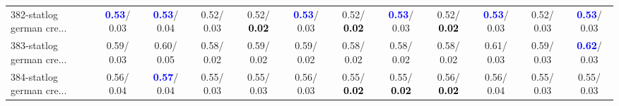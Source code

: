 \begin{table}[h]
\begin{center}
{\begin{tabular}{lc|c|c|c|c|c|c|c|c|c|c}
382-statlog german cre... & \textcolor{blue}{\textbf{  0.53}}/  0.03 & \textcolor{blue}{\textbf{  0.53}}/  0.04 &   0.52/  0.03 &   0.52/\textcolor{black}{\textbf{  0.02}} & \textcolor{blue}{\textbf{  0.53}}/  0.03 &   0.52/\textcolor{black}{\textbf{  0.02}} & \textcolor{blue}{\textbf{  0.53}}/  0.03 &   0.52/\textcolor{black}{\textbf{  0.02}} & \textcolor{blue}{\textbf{  0.53}}/  0.03 &   0.52/  0.03 & \textcolor{blue}{\textbf{  0.53}}/  0.03 \\
383-statlog german cre... &   0.59/  0.03 &   0.60/  0.05 &   0.58/  0.02 &   0.59/  0.02 &   0.59/  0.02 &   0.58/  0.02 &   0.58/  0.02 &   0.58/  0.02 &   0.61/  0.03 &   0.59/  0.03 & \textcolor{blue}{\textbf{  0.62}}/  0.03 \\
384-statlog german cre... &   0.56/  0.04 & \textcolor{blue}{\textbf{  0.57}}/  0.04 &   0.55/  0.03 &   0.55/  0.03 &   0.56/  0.03 &   0.55/\textcolor{black}{\textbf{  0.02}} &   0.55/\textcolor{black}{\textbf{  0.02}} &   0.56/\textcolor{black}{\textbf{  0.02}} &   0.56/  0.04 &   0.55/  0.03 &   0.55/  0.03 \\\end{tabular}}\label{stratsALCKappa11Allalla}
\end{center}
\end{table}
